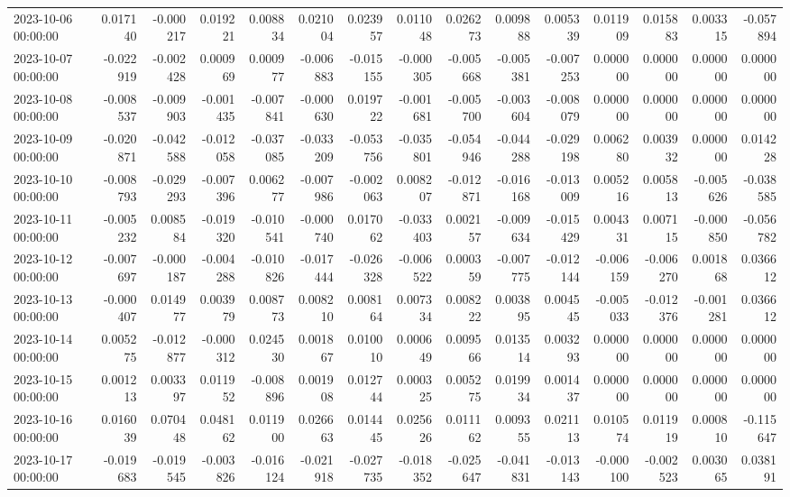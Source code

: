 \begin{tabular}{lrrrrrrrrrrrrrr}
2023-10-06 00:00:00 & 0.017140 & -0.000217 & 0.019221 & 0.008834 & 0.021004 & 0.023957 & 0.011048 & 0.026273 & 0.009888 & 0.005339 & 0.011909 & 0.015883 & 0.003315 & -0.057894 \\
2023-10-07 00:00:00 & -0.022919 & -0.002428 & 0.000969 & 0.000977 & -0.006883 & -0.015155 & -0.000305 & -0.005668 & -0.005381 & -0.007253 & 0.000000 & 0.000000 & 0.000000 & 0.000000 \\
2023-10-08 00:00:00 & -0.008537 & -0.009903 & -0.001435 & -0.007841 & -0.000630 & 0.019722 & -0.001681 & -0.005700 & -0.003604 & -0.008079 & 0.000000 & 0.000000 & 0.000000 & 0.000000 \\
2023-10-09 00:00:00 & -0.020871 & -0.042588 & -0.012058 & -0.037085 & -0.033209 & -0.053756 & -0.035801 & -0.054946 & -0.044288 & -0.029198 & 0.006280 & 0.003932 & 0.000000 & 0.014228 \\
2023-10-10 00:00:00 & -0.008793 & -0.029293 & -0.007396 & 0.006277 & -0.007986 & -0.002063 & 0.008207 & -0.012871 & -0.016168 & -0.013009 & 0.005216 & 0.005813 & -0.005626 & -0.038585 \\
2023-10-11 00:00:00 & -0.005232 & 0.008584 & -0.019320 & -0.010541 & -0.000740 & 0.017062 & -0.033403 & 0.002157 & -0.009634 & -0.015429 & 0.004331 & 0.007115 & -0.000850 & -0.056782 \\
2023-10-12 00:00:00 & -0.007697 & -0.000187 & -0.004288 & -0.010826 & -0.017444 & -0.026328 & -0.006522 & 0.000359 & -0.007775 & -0.012144 & -0.006159 & -0.006270 & 0.001868 & 0.036612 \\
2023-10-13 00:00:00 & -0.000407 & 0.014977 & 0.003979 & 0.008773 & 0.008210 & 0.008164 & 0.007334 & 0.008222 & 0.003895 & 0.004545 & -0.005033 & -0.012376 & -0.001281 & 0.036612 \\
2023-10-14 00:00:00 & 0.005275 & -0.012877 & -0.000312 & 0.024530 & 0.001867 & 0.010010 & 0.000649 & 0.009566 & 0.013514 & 0.003293 & 0.000000 & 0.000000 & 0.000000 & 0.000000 \\
2023-10-15 00:00:00 & 0.001213 & 0.003397 & 0.011952 & -0.008896 & 0.001908 & 0.012744 & 0.000325 & 0.005275 & 0.019934 & 0.001437 & 0.000000 & 0.000000 & 0.000000 & 0.000000 \\
2023-10-16 00:00:00 & 0.016039 & 0.070448 & 0.048162 & 0.011900 & 0.026663 & 0.014445 & 0.025626 & 0.011162 & 0.009355 & 0.021113 & 0.010574 & 0.011919 & 0.000810 & -0.115647 \\
2023-10-17 00:00:00 & -0.019683 & -0.019545 & -0.003826 & -0.016124 & -0.021918 & -0.027735 & -0.018352 & -0.025647 & -0.041831 & -0.013143 & -0.000100 & -0.002523 & 0.003065 & 0.038191 \\

\end{tabular}
